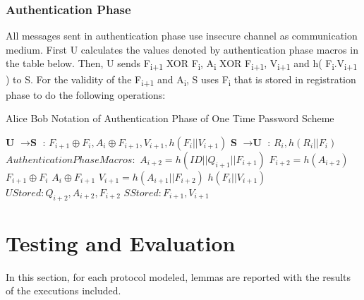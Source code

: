 \documentclass[a4paper, 12pt, titlepage]{article}
\begin{document}
\subsubsection{Authentication Phase}
All messages sent in authentication phase use insecure channel as communication medium. First U calculates the values denoted by authentication phase macros in the table below. Then, U sends F\textsubscript{i+1} XOR F\textsubscript{i}, A\textsubscript{i} XOR F\textsubscript{i+1},  V\textsubscript{i+1} and h( F\textsubscript{i}.V\textsubscript{i+1} ) to S. 
For the validity of the F\textsubscript{i+1} and A\textsubscript{i}, S uses F\textsubscript{i} that is stored in registration phase to do the following operations:

\begin{algorithm}[H]
    \caption{Alice Bob Notation of Authentication Phase of One Time Password Scheme \cite{otparticle}}
    \label{algo:otpauth}
    \begin{algorithmic}[1]
        \State \textbf{U} $ \rightarrow \textbf{S} $ : $F_{i+1} \oplus F_i, A_i \oplus F_{i+1},  V_{i+1}, h( F_i || V_{i+1} )$
        \State \textbf{S} $ \rightarrow \textbf{U} $ : $R_i, h( R_i || F_i )$
        \State $ Authentication Phase Macros: $
        \State $   A_{i+2} = h( ID || Q_{i+1} || F_{i+1} ) $
        \State $ F_{i+2} = h( A_{i+2} ) $
        \State $ F_{i+1} \oplus F_i $
        \State $ A_i \oplus F_{i+1} $
        \State $ V_{i+1} = h( A_{i+1} || F_{i+2} )$
        \State $ h( F_i || V_{i+1} ) $
        \State $ U Stored: Q_{i+2},A_{i+2},F_{i+2} $
        \State $ S Stored: F_{i+1},V_{i+1} $
    \end{algorithmic}
\end{algorithm}

\newpage
\section{Testing and Evaluation}
In this section, for each protocol modeled, lemmas are reported with the results of the executions included.
\end{document}
